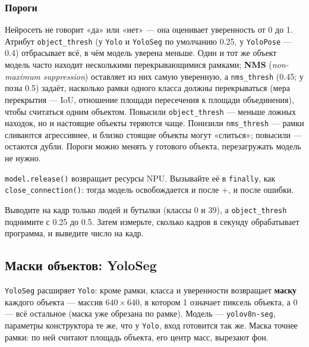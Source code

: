 \subsubsection*{Пороги}

Нейросеть не говорит «да» или «нет» --- она оценивает уверенность от 0 до 1. Атрибут \verb|object_thresh| (у \texttt{Yolo} и \texttt{YoloSeg} по умолчанию 0.25, у \texttt{YoloPose} --- 0.4) отбрасывает всё, в чём модель уверена меньше. Один и тот же объект модель часто находит несколькими перекрывающимися рамками; \textbf{NMS} (\emph{non-maximum suppression}) оставляет из них самую уверенную, а \verb|nms_thresh| (0.45; у позы 0.5) задаёт, насколько рамки одного класса должны перекрываться (мера перекрытия --- IoU, отношение площади пересечения к площади объединения), чтобы считаться одним объектом. Повысили \verb|object_thresh| --- меньше ложных находок, но и настоящие объекты теряются чаще. Понизили \verb|nms_thresh| --- рамки сливаются агрессивнее, и близко стоящие объекты могут «слиться»; повысили --- остаются дубли. Пороги можно менять у готового объекта, перезагружать модель не нужно.

\begin{rulebox}
\verb|model.release()| возвращает ресурсы NPU. Вызывайте её в \verb|finally|, как \verb|close_connection()|: тогда модель освобождается и после +, и после ошибки.
\end{rulebox}

\begin{taskbox}
Выводите на кадр только людей и бутылки (классы 0 и 39), а \verb|object_thresh| поднимите с 0.25 до 0.5. Затем измерьте, сколько кадров в секунду обрабатывает программа, и выведите число на кадр.
\end{taskbox}

\subsection{Маски объектов: YoloSeg}

\verb|YoloSeg| расширяет \verb|Yolo|: кроме рамки, класса и уверенности возвращает \textbf{маску} каждого объекта --- массив $640\times640$, в котором 1 означает пиксель объекта, а 0 --- всё остальное (маска уже обрезана по рамке). Модель --- \texttt{yolov8n-seg}, параметры конструктора те же, что у \texttt{Yolo}, вход готовится так же. Маска точнее рамки: по ней считают площадь объекта, его центр масс, вырезают фон.

